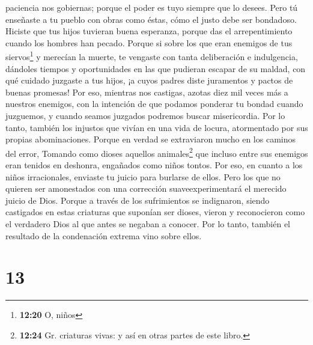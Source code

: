 paciencia nos gobiernas; porque el poder es tuyo siempre que lo desees.
 Pero tú enseñaste a tu pueblo con obras como éstas, cómo
el justo debe ser bondadoso. Hiciste que tus hijos tuvieran buena
esperanza, porque das el arrepentimiento cuando los hombres han pecado.
 Porque si sobre los que eran enemigos de tus
siervos\footnote{\textbf{12:20} O, niños} y merecían la muerte, te
vengaste con tanta deliberación e indulgencia, dándoles tiempos y
oportunidades en las que pudieran escapar de su maldad, 
con qué cuidado juzgaste a tus hijos, ¡a cuyos padres diste juramentos y
pactos de buenas promesas!  Por eso, mientras nos
castigas, azotas diez mil veces más a nuestros enemigos, con la
intención de que podamos ponderar tu bondad cuando juzguemos, y cuando
seamos juzgados podremos buscar misericordia.  Por lo
tanto, también los injustos que vivían en una vida de locura,
atormentado por sus propias abominaciones.  Porque en
verdad se extraviaron mucho en los caminos del error, Tomando como
dioses aquellos animales\footnote{\textbf{12:24} Gr. criaturas vivas: y
  así en otras partes de este libro.} que incluso entre sus enemigos
eran tenidos en deshonra, engañados como niños tontos. 
Por eso, en cuanto a los niños irracionales, enviaste tu juicio para
burlarse de ellos.  Pero los que no quieren ser
amonestados con una corrección suaveexperimentará el merecido juicio de
Dios.  Porque a través de los sufrimientos se indignaron,
siendo castigados en estas criaturas que suponían ser dioses, vieron y
reconocieron como el verdadero Dios al que antes se negaban a conocer.
Por lo tanto, también el resultado de la condenación extrema vino sobre
ellos.

\hypertarget{section-12}{%
\section{13}\label{section-12}}

